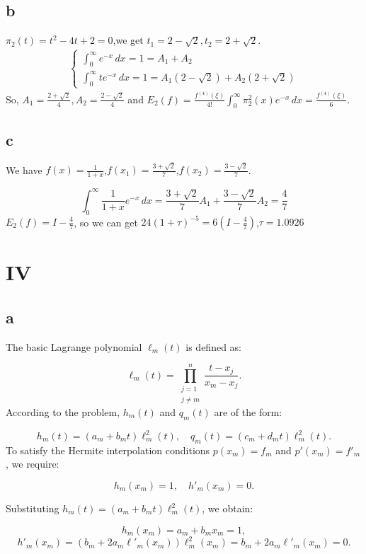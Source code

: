 \documentclass[a4paper]{article}
\begin{document}
\subsection*{b}
$\pi_2(t) = t^2-4t+2 = 0$,we get $t_1 = 2 - \sqrt{2},t_2 = 2 + \sqrt{2}$.
\begin{align*}
  \left\{
  \begin{array}{l}
  \int_{0}^{\infty} e^{-x} \,dx = 1 = A_1 + A_2\\
  \int_{0}^{\infty} te^{-x} \,dx = 1 = A_1(2-\sqrt{2})+A_2(2+\sqrt{2}) 
  \end{array}
  \right.
\end{align*}
So, $A_1 = \frac{2+\sqrt{2}}{4},A_2 = \frac{2-\sqrt{2}}{4}$ and $E_2(f) = \frac{f^{(4)}(\xi)}{4!} \int_{0}^{\infty} \pi_2^2(x)e^{-x} \,dx = \frac{f^{(4)}(\xi)}{6}$.

\subsection*{c}
We have $f(x) = \frac{1}{1+x}$,$f(x_1)=\frac{3+\sqrt{2}}{7}$,$f(x_2)=\frac{3-\sqrt{2}}{7}$.

  $$\int_{0}^{\infty} \frac{1}{1+x}e^{-x} \,dx = \frac{3+\sqrt{2}}{7}A_1+\frac{3-\sqrt{2}}{7}A_2=\frac{4}{7}$$
$E_2(f)= I - \frac{4}{7}$, so we can get $24(1+\tau )^{-5}=6(I-\frac{4}{7})$,$\tau = 1.0926$

\section*{IV}
\subsection*{a}
The basic Lagrange polynomial \( \ell_m(t) \) is defined as:

\[
\ell_m(t) = \prod_{\substack{j=1 \\ j \neq m}}^{n} \frac{t - x_j}{x_m - x_j}.
\]
According to the problem, \( h_m(t) \) and \( q_m(t) \) are of the form:

\[
h_m(t) = (a_m + b_m t) \ell_m^2(t), \quad q_m(t) = (c_m + d_m t) \ell_m^2(t).
\]
To satisfy the Hermite interpolation conditions \( p(x_m) = f_m \) and \( p'(x_m) = f'_m \), we require:

\[
h_m(x_m) = 1, \quad h'_m(x_m) = 0.
\]

Substituting \( h_m(t) = (a_m + b_m t) \ell_m^2(t) \), we obtain:

\[
h_m(x_m) = a_m + b_mx_m = 1,
\]
\[
h'_m(x_m) = (b_m + 2a_m \ell'_m(x_m)) \ell_m^2(x_m) = b_m + 2a_m \ell'_m(x_m) = 0.
\]
\end{document}
